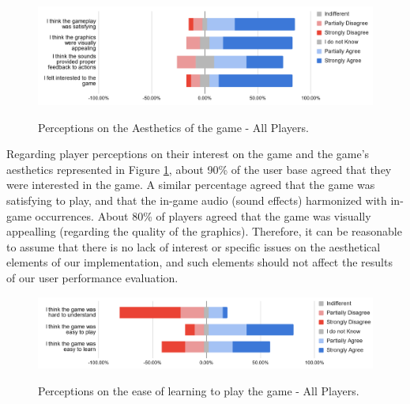 \begin{figure}[!ht]
    \begin{center}
    \caption{Perceptions on the Aesthetics of the game - All Players.}
        \includegraphics[width=36em]{figures/fig-perception-aesthetics-all-players.png}
        \label{fig:perception-aesthetics-all-players}
    \end{center}
\end{figure}

Regarding player perceptions on their interest on the game and the game's aesthetics represented in Figure \ref{fig:perception-aesthetics-all-players}, about 90\% of the user base agreed that they were interested in the game. A similar percentage agreed that the game was satisfying to play, and that the in-game audio (sound effects) harmonized with in-game occurrences. About 80\% of players agreed that the game was visually appealling (regarding the quality of the graphics). Therefore, it can be reasonable to assume that there is no lack of interest or specific issues on the aesthetical elements of our implementation, and such elements should not affect the results of our user performance evaluation.

\begin{figure}[!ht]
    \begin{center}
    \caption{Perceptions on the ease of learning to play the game - All Players.}
        \includegraphics[width=36em]{figures/fig-perception-learning-all-players.png}
        \label{fig:perception-learning-all-players}
    \end{center}
\end{figure}

